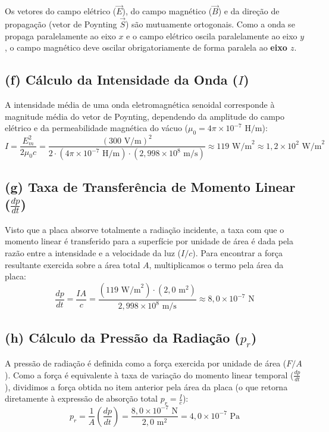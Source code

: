 \documentclass[12pt,a4paper]{article}
\begin{document}
Os vetores do campo elétrico ($\vec{E}$), do campo magnético ($\vec{B}$) e da direção de propagação (vetor de Poynting $\vec{S}$) são mutuamente ortogonais. Como a onda se propaga paralelamente ao eixo $x$ e o campo elétrico oscila paralelamente ao eixo $y$, o campo magnético deve oscilar obrigatoriamente de forma paralela ao \textbf{eixo $z$}.

\subsection*{(f) Cálculo da Intensidade da Onda ($I$)}

A intensidade média de uma onda eletromagnética senoidal corresponde à magnitude média do vetor de Poynting, dependendo da amplitude do campo elétrico e da permeabilidade magnética do vácuo ($\mu_0 = 4\pi \times 10^{-7}\text{ H/m}$):
\begin{equation*}
I = \frac{E_m^2}{2\mu_0 c} = \frac{(300\text{ V/m})^2}{2 \cdot (4\pi \times 10^{-7}\text{ H/m}) \cdot (2,998 \times 10^8\text{ m/s})} \approx 119\text{ W/m}^2 \approx 1,2 \times 10^2\text{ W/m}^2
\end{equation*}

\subsection*{(g) Taxa de Transferência de Momento Linear ($\frac{dp}{dt}$)}

Visto que a placa absorve totalmente a radiação incidente, a taxa com que o momento linear é transferido para a superfície por unidade de área é dada pela razão entre a intensidade e a velocidade da luz ($I/c$). Para encontrar a força resultante exercida sobre a área total $A$, multiplicamos o termo pela área da placa:
\begin{equation*}
\frac{dp}{dt} = \frac{I A}{c} = \frac{(119\text{ W/m}^2) \cdot (2,0\text{ m}^2)}{2,998 \times 10^8\text{ m/s}} \approx 8,0 \times 10^{-7}\text{ N}
\end{equation*}

\subsection*{(h) Cálculo da Pressão da Radiação ($p_r$)}

A pressão de radiação é definida como a força exercida por unidade de área ($F/A$). Como a força é equivalente à taxa de variação do momento linear temporal ($\frac{dp}{dt}$), dividimos a força obtida no item anterior pela área da placa (o que retorna diretamente à expressão de absorção total $p_r = \frac{I}{c}$):
\begin{equation*}
p_r = \frac{1}{A}\left(\frac{dp}{dt}\right) = \frac{8,0 \times 10^{-7}\text{ N}}{2,0\text{ m}^2} = 4,0 \times 10^{-7}\text{ Pa}
\end{equation*}
\end{document}
